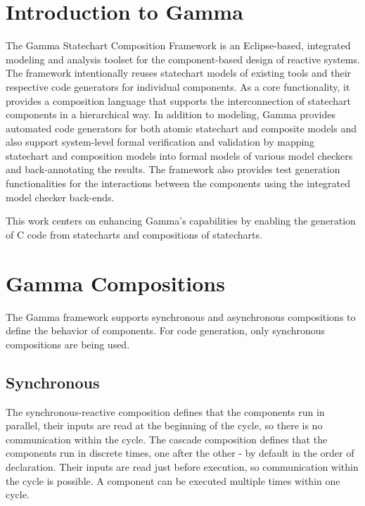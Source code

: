 \newpage

\section{Introduction to Gamma}

The Gamma Statechart Composition Framework is an Eclipse-based, integrated modeling and analysis toolset for the component-based design of reactive systems. The framework intentionally reuses statechart models of existing tools and their respective code generators for individual components. As a core functionality, it provides a composition language that supports the interconnection of statechart components in a hierarchical way. In addition to modeling, Gamma provides automated code generators for both atomic statechart and composite models and also support system-level formal verification and validation by mapping statechart and composition models into formal models of various model checkers and back-annotating the results. The framework also provides test generation functionalities for the interactions between the components using the integrated model checker back-ends.

This work centers on enhancing Gamma's capabilities by enabling the generation of C code from statecharts and compositions of statecharts.

\section{Gamma Compositions}

The Gamma framework supports synchronous and asynchronous compositions to define the behavior of components. For code generation, only synchronous compositions are being used.

\subsection{Synchronous}

The synchronous-reactive composition defines that the components run in parallel, their inputs are read at the beginning of the cycle, so there is no communication within the cycle. The cascade composition defines that the components run in discrete times, one after the other - by default in the order of declaration. Their inputs are read just before execution, so communication within the cycle is possible. A component can be executed multiple times within one cycle.

